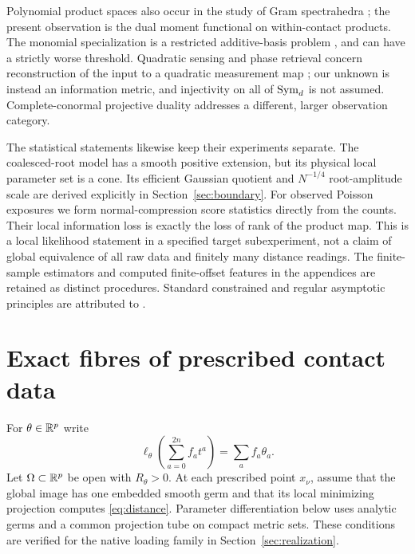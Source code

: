 Polynomial product spaces also occur in the study of Gram spectrahedra \cite{Sch}; the present observation is the dual moment functional on within-contact products. The monomial specialization is a restricted additive-basis problem \cite{Yu,Kohonen14,Kohonen17}, and can have a strictly worse threshold. Quadratic sensing and phase retrieval concern reconstruction of the input to a quadratic measurement map \cite{BCE}; our unknown is instead an information metric, and injectivity on all of $\operatorname{Sym}_d$ is not assumed. Complete-conormal projective duality \cite{GKZ} addresses a different, larger observation category.

The statistical statements likewise keep their experiments separate. The coalesced-root model has a smooth positive extension, but its physical local parameter set is a cone. Its efficient Gaussian quotient and $N^{-1/4}$ root-amplitude scale are derived explicitly in Section~\ref{sec:boundary}. For observed Poisson exposures we form normal-compression score statistics directly from the counts. Their local information loss is exactly the loss of rank of the product map. This is a local likelihood statement in a specified target subexperiment, not a claim of global equivalence of all raw data and finitely many distance readings. The finite-sample estimators and computed finite-offset features in the appendices are retained as distinct procedures. Standard constrained and regular asymptotic principles are attributed to \cite{Geyer,vdV}.

\section{Exact fibres of prescribed contact data}\label{sec:contact}
For $\theta\in\mathbb R^p$ write
\[
 \ell_\theta\left(\sum_{a=0}^{2n}f_at^a\right)=\sum_a f_a\theta_a.
\]
Let $\Omega\subset\mathbb R^p$ be open with $R_\theta>0$. At each prescribed point $x_\nu$, assume that the global image has one embedded smooth germ and that its local minimizing projection computes \eqref{eq:distance}. Parameter differentiation below uses analytic germs and a common projection tube on compact metric sets. These conditions are verified for the native loading family in Section~\ref{sec:realization}.

